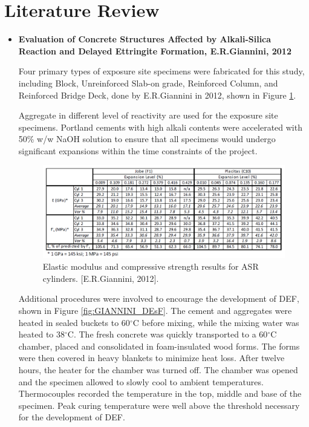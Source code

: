\section{Literature Review}

\begin{itemize}

    \item
    \textbf{Evaluation of Concrete Structures Affected by Alkali-Silica Reaction and Delayed Ettringite Formation, E.R.Giannini, 2012\cite{GIANNINI}}

    Four primary types of exposure site specimens were fabricated for this study, including Block, Unreinforced Slab-on grade, Reinforced Column, and Reinforced Bridge Deck, done by  E.R.Giannini in 2012\cite{GIANNINI}, shown in Figure \ref{fig:GIANNINI_DEFss}.

    Aggregate in different level of reactivity are used for the exposure site specimens. Portland cements with high alkali contents were accelerated with 50\% w/w NaOH solution to ensure that all specimens would undergo significant expansions within the time constraints of the project.

    \begin{figure}[ht!]
        \centering
        \includegraphics[width=.9\linewidth]{Files/Background/GIANNINI_ASR.png}
        \caption{Elastic modulus and compressive strength results for ASR cylinders. [E.R.Giannini, 2012\cite{GIANNINI}].}
        \label{fig:GIANNINI_DEFss}
    \end{figure}

    Additional procedures were involved to encourage the development of DEF, shown in Figure \ref{fig:GIANNINI_DEsF}. The cement and aggregates were heated in sealed buckets to 60$^\circ$C before mixing, while the mixing water was heated to 38$^\circ$C. The fresh concrete was quickly transported to a 60$^\circ$C chamber, placed and consolidated in foam-insulated wood forms. The forms were then covered in heavy blankets to minimize heat loss. After twelve hours, the heater for the chamber was turned off. The chamber was opened and the specimen allowed to slowly cool to ambient temperatures. Thermocouples recorded the temperature in the top, middle and base of the specimen. Peak curing temperature were well above the threshold necessary for the development of DEF.


\end{itemize}
